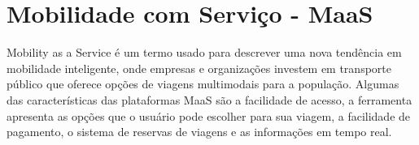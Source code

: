






\section{Mobilidade com Serviço - MaaS}

Mobility as a Service é um termo usado para descrever uma nova tendência em mobilidade inteligente, onde empresas e organizações investem em transporte público que oferece opções de viagens multimodais para a população. Algumas das características das plataformas MaaS são a facilidade de acesso, a ferramenta apresenta as opções que o usuário pode escolher para sua viagem, a facilidade de pagamento, o sistema de reservas de viagens e as informações em tempo real.

